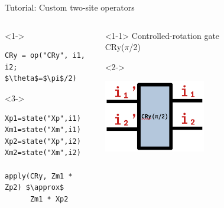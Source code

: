 \begin{frame}[fragile]{Tutorial: Custom two-site operators}

\begin{columns}

\begin{column}{5.5cm}

\begin{onlyenv}<1->
\begin{lstlisting}[language=JuliaLocal, style=julia, mathescape, basicstyle=\scriptsize\ttfamily]
CRy = op("CRy", i1, i2; $\theta$=$\pi$/2)
\end{lstlisting}
\end{onlyenv}

\begin{onlyenv}<3->
~\\
\begin{lstlisting}[language=JuliaLocal, style=julia, mathescape, basicstyle=\scriptsize\ttfamily]
Xp1=state("Xp",i1)
Xm1=state("Xm",i1)
Xp2=state("Xp",i2)
Xm2=state("Xm",i2)

apply(CRy, Zm1 * Zp2) $\approx$
      Zm1 * Xp2
\end{lstlisting}
\end{onlyenv}

\end{column}

\begin{column}{4.5cm}

\begin{onlyenv}<1-1>
Controlled-rotation gate \\
CRy($\pi$/2)
\end{onlyenv}

\begin{onlyenv}<2->
\vspace*{0.0cm}
\begin{center}
\includegraphics[width=0.5\textwidth]{
  slides/assets/CRy_pi_by_2.png
}
\end{center}
\vspace*{0.0cm}
\end{onlyenv}


\end{column}
\end{columns}
\end{frame}
